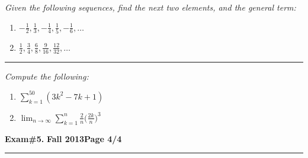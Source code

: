 \documentclass[12pt]{article}
\begin{document}
{ \em Given the following sequences, find the next two elements, and the general term:}
\begin{enumerate}
\item $-\frac{1}{2},\frac{1}{3},-\frac{1}{4},\frac{1}{5},-\frac{1}{6},\dotsc$

\vspace{0.5cm}
\begin{flushright}
\end{flushright}
\item $\frac{1}{2}, \frac{3}{4}, \frac{6}{8}, \frac{9}{16}, \frac{12}{32}, \dotsc$

\vspace{0.5cm}
\begin{flushright}
\end{flushright}
\end{enumerate}
\hrule

{ \em Compute the following:}
\begin{enumerate}
\item $\displaystyle{\sum_{k=1}^{50} (3k^2-7k+1)}$
\vspace{2cm}
\begin{flushright}
\end{flushright}
\item $\displaystyle{\lim_{n\to \infty} \sum_{k=1}^n \frac{2}{n} \bigg( \frac{2k}{n}\bigg)^3}$
\vspace{3.5cm}
\begin{flushright}
\end{flushright}
\end{enumerate}
\newpage

\hfill{\large\bf Exam\#5.}\hfill{\large\bf
  Fall 2013}\hfill{\large\bf Page 4/4}\hrule
  
\end{document}
